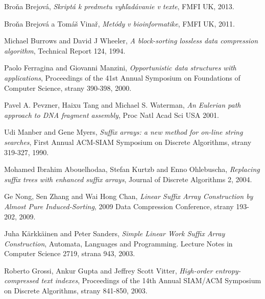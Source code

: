 \begin{thebibliography}{99}
 
        Broňa Brejová,
        \emph{Skriptá k predmetu vyhľadávanie v texte},
        FMFI UK,
        2013.
        
        Broňa Brejová a Tomáš Vinař,
        \emph{Metódy v bioinformatike},
        FMFI UK,
        2011.
        
        Michael Burrows and David J Wheeler,
        \emph{A block-sorting lossless data compression algorithm},     
        Technical Report 124,
        1994.
        
        Paolo Ferragina and Giovanni Manzini,
        \emph{Opportunistic data structures with applications},
        Proceedings of the 41st Annual Symposium on Foundations of Computer
        Science, strany 390-398,
        2000.
        
        Pavel A. Pevzner, Haixu Tang and Michael S. Waterman,
        \emph{An Eulerian path approach to DNA fragment assembly},
        Proc Natl Acad Sci USA
        2001.
        
        Udi Manber and Gene Myers,
        \emph{Suffix arrays: a new method for on-line string searches},
        First Annual ACM-SIAM Symposium on Discrete Algorithms, strany 319-327,
        1990.
        
        Mohamed Ibrahim Abouelhodaa, Stefan Kurtzb and Enno Ohlebuscha,
        \emph{Replacing suffix trees with enhanced suffix arrays},
        Journal of Discrete Algorithms 2,
        2004.
        
        Ge Nong, Sen Zhang and Wai Hong Chan,
        \emph{Linear Suffix Array Construction by Almost Pure Induced-Sorting},
        2009 Data Compression Conference, strany 193-202,
        2009.
        
        Juha Kärkkäinen and Peter Sanders,
        \emph{Simple Linear Work Suffix Array Construction},
        Automata, Languages and Programming. Lecture Notes in Computer Science
        2719, strana 943,
        2003.
        
        Roberto Grossi, Ankur Gupta and Jeffrey Scott Vitter,
        \emph{High-order entropy-compressed text indexes},
        Proceedings of the 14th Annual SIAM/ACM Symposium on Discrete Algorithms, strany 841-850,
        2003.
        

\end{thebibliography}
